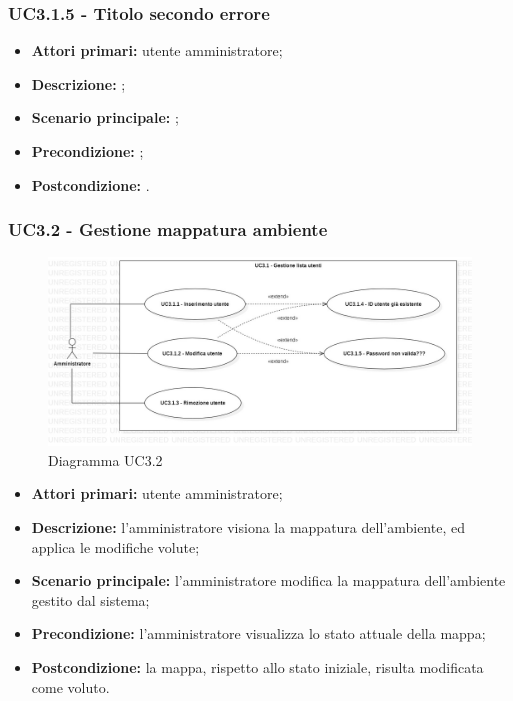 \subsubsection{UC3.1.5 - Titolo secondo errore}
\begin{itemize}
	\item \textbf{Attori primari:} utente amministratore;
	\item \textbf{Descrizione:} ;
	\item \textbf{Scenario principale:} ;
	\item \textbf{Precondizione:} ;
	\item \textbf{Postcondizione:} .
\end{itemize}

\subsubsection{UC3.2 - Gestione mappatura ambiente}
	\begin{center}
		\begin{figure}[h!]
			\includegraphics[width=15cm]{images/uc3.1.jpg}
			\caption{Diagramma UC3.2}
		\end{figure}
	\end{center}
	\begin{itemize}
		\item \textbf{Attori primari:} utente amministratore;
		\item \textbf{Descrizione:} l'amministratore visiona la mappatura dell'ambiente, ed applica le modifiche volute;
		\item \textbf{Scenario principale:} l'amministratore modifica la mappatura dell'ambiente gestito dal sistema;
		\item \textbf{Precondizione:} l'amministratore visualizza lo stato attuale della mappa;
		\item \textbf{Postcondizione:} la mappa, rispetto allo stato iniziale, risulta modificata come voluto.
	\end{itemize}

